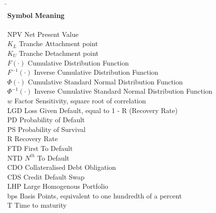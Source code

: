     
\begin{symbolindex}

{\renewcommand{\baselinestretch}{1}
\small\normalsize
\begin{tabbing}
\hspace*{4cm}\=\kill \\
{\bf Symbol} \>        {\bf Meaning}\\
\\
NPV \> 		 Net Present Value\\
$K_L$ \> 		 Tranche Attachment point \\
$K_U$ \>  		 Tranche Detachment point \\
$F (\cdot)$ \> Cumulative Distribution Function \\
$F^{-1} (\cdot)$ \> Inverse Cumulative Distribution Function \\
$\Phi (\cdot)$ \> Cumulative Standard Normal Distribution Function \\
$\Phi^{-1} (\cdot)$ \> Inverse Cumulative Standard Normal Distribution Function \\
$w$		\>	Factor Sensitivity, square root of correlation \\
LGD	\>		Loss Given Default, equal to 1 - R (Recovery Rate) \\
PD	\>		Probability of Default \\
PS	\>		Probability of Survival \\
R	\>		Recovery Rate \\
FTD \>		First To Default \\
NTD \>		$N^{th}$ To Default \\
CDO	\> 		Collateralised Debt Obligation \\
CDS \>		Credit Default Swap \\
LHP \>		Large Homogenous Portfolio \\
bps \>		Basis Points, equivalent to one hundredth of a percent \\
T	\>		Time to maturity \\
	
\end{tabbing}

}


\end{symbolindex}

